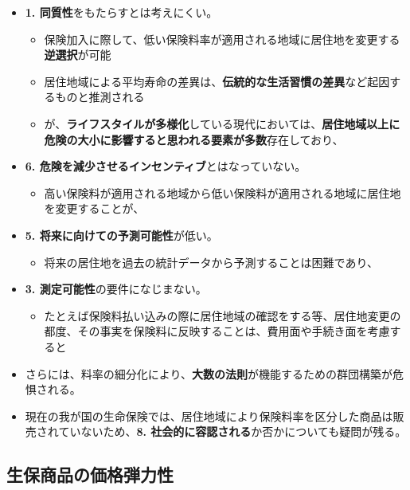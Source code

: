 \documentclass[report,gutter=10mm,fore-edge=10mm,uplatex,dvipdfmx]{jlreq}
\begin{document}
\begin{itemize}
\tightlist
\item
  \textbf{1. 同質性}をもたらすとは考えにくい。

  \begin{itemize}
  \tightlist
  \item
    保険加入に際して、低い保険料率が適用される地域に居住地を変更する\textbf{逆選択}が可能
  \item
    居住地域による平均寿命の差異は、\textbf{伝統的な生活習慣の差異}など起因するものと推測される
  \item
    が、\textbf{ライフスタイルが多様化}している現代においては、\textbf{居住地域以上に危険の大小に影響すると思われる要素が多数}存在しており、
  \end{itemize}
\item
  \textbf{6. 危険を減少させるインセンティブ}とはなっていない。

  \begin{itemize}
  \tightlist
  \item
    高い保険料が適用される地域から低い保険料が適用される地域に居住地を変更することが、
  \end{itemize}
\item
  \textbf{5. 将来に向けての予測可能性}が低い。

  \begin{itemize}
  \tightlist
  \item
    将来の居住地を過去の統計データから予測することは困難であり、
  \end{itemize}
\item
  \textbf{3. 測定可能性}の要件になじまない。

  \begin{itemize}
  \tightlist
  \item
    たとえば保険料払い込みの際に居住地域の確認をする等、居住地変更の都度、その事実を保険料に反映することは、費用面や手続き面を考慮すると
  \end{itemize}
\item
  さらには、料率の細分化により、\textbf{大数の法則}が機能するための群団構築が危惧される。
\item
  現在の我が国の生命保険では、居住地域により保険料率を区分した商品は販売されていないため、\textbf{8.
  社会的に容認される}か否かについても疑問が残る。
\end{itemize}

\subsection{生保商品の価格弾力性}
\end{document}
